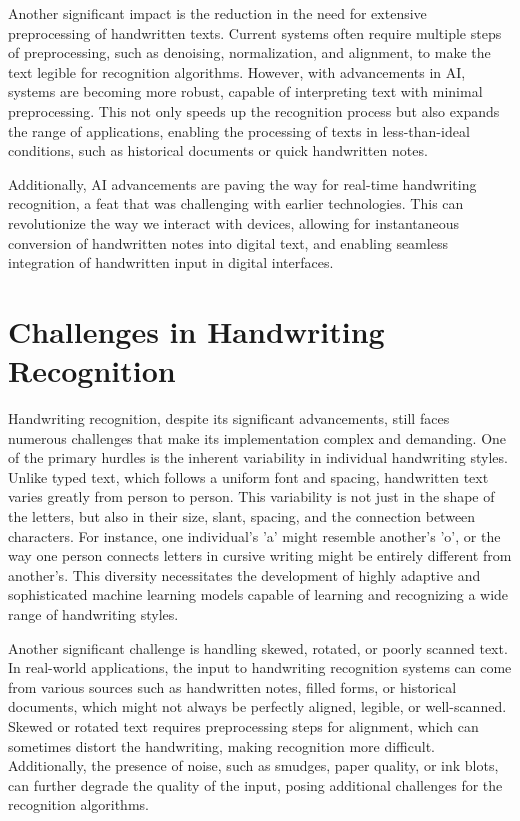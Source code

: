 \documentclass[12pt]{article}
\begin{document}
Another significant impact is the reduction in the need for extensive preprocessing of handwritten texts. Current systems often require multiple steps of preprocessing, such as denoising, normalization, and alignment, to make the text legible for recognition algorithms. However, with advancements in AI, systems are becoming more robust, capable of interpreting text with minimal preprocessing. This not only speeds up the recognition process but also expands the range of applications, enabling the processing of texts in less-than-ideal conditions, such as historical documents or quick handwritten notes.

Additionally, AI advancements are paving the way for real-time handwriting recognition, a feat that was challenging with earlier technologies. This can revolutionize the way we interact with devices, allowing for instantaneous conversion of handwritten notes into digital text, and enabling seamless integration of handwritten input in digital interfaces.

\section* {Challenges in Handwriting Recognition}
Handwriting recognition, despite its significant advancements, still faces numerous challenges that make its implementation complex and demanding. One of the primary hurdles is the inherent variability in individual handwriting styles. Unlike typed text, which follows a uniform font and spacing, handwritten text varies greatly from person to person. This variability is not just in the shape of the letters, but also in their size, slant, spacing, and the connection between characters. For instance, one individual's 'a' might resemble another's 'o', or the way one person connects letters in cursive writing might be entirely different from another's. This diversity necessitates the development of highly adaptive and sophisticated machine learning models capable of learning and recognizing a wide range of handwriting styles.

Another significant challenge is handling skewed, rotated, or poorly scanned text. In real-world applications, the input to handwriting recognition systems can come from various sources such as handwritten notes, filled forms, or historical documents, which might not always be perfectly aligned, legible, or well-scanned. Skewed or rotated text requires preprocessing steps for alignment, which can sometimes distort the handwriting, making recognition more difficult. Additionally, the presence of noise, such as smudges, paper quality, or ink blots, can further degrade the quality of the input, posing additional challenges for the recognition algorithms.



\cite{Advances}
\cite{Improvements}
\cite{OF}
\end{document}
